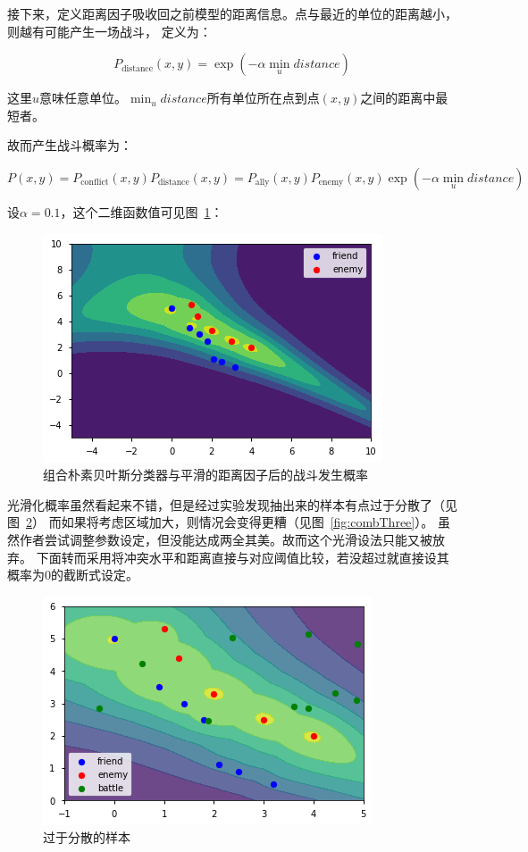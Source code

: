 \documentclass{sicnuthesis}
\begin{document}
接下来，定义距离因子吸收回之前模型的距离信息。点与最近的单位的距离越小，则越有可能产生一场战斗，
定义为：

$$
P_{\text{distance}}(x,y) = \exp(-\alpha \min_{u} distance)
$$


这里$u$意味任意单位。$\min_u distance$所有单位所在点到点$(x,y)$之间的距离中最短者。

故而产生战斗概率为：

$$
P(x,y) = P_{\text{conflict}}(x,y) P_{\text{distance}}(x,y) = 
P_\text{ally}(x,y) P_\text{enemy}(x,y) \exp(-\alpha \min_{u} distance)
$$


设$\alpha=0.1$，这个二维函数值可见图~\ref{fig:combOne}：

\begin{figure}[htb]
\includegraphics[width=0.6\linewidth]{comb1.png}
\caption{
组合朴素贝叶斯分类器与平滑的距离因子后的战斗发生概率}
\label{fig:combOne}
\end{figure}

光滑化概率虽然看起来不错，但是经过实验发现抽出来的样本有点过于分散了（见图~\ref{fig:combTwo}）
而如果将考虑区域加大，则情况会变得更糟（见图~\ref{fig:combThree}）。
虽然作者尝试调整参数设定，但没能达成两全其美。故而这个光滑设法只能又被放弃。
下面转而采用将冲突水平和距离直接与对应阈值比较，若没超过就直接设其概率为0的截断式设定。

\begin{figure}[htb]
\includegraphics[width=0.6\linewidth]{comb2.png}
\caption{过于分散的样本}
\label{fig:combTwo}
\end{figure}
\end{document}
